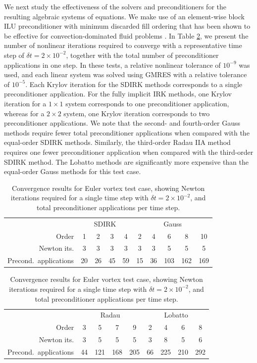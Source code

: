 \documentclass[review]{siamart}
\begin{document}
We next study the effectiveness of the solvers and preconditioners for the
resulting algebraic systems of equations. We make use of an element-wise block
ILU preconditioner with minimum discarded fill ordering that has been shown to
be effective for convection-dominated fluid problems \cite{Persson2008}. In
Table \ref{tab:ev-solvers}, we present the number of nonlinear iterations
required to converge with a representative time step of $\delta t = 2 \times
10^{-2}$, together with the total number of preconditioner applications in one
step. In these tests, a relative nonlinear tolerance of $10^{-9}$ was used, and
each linear system was solved using GMRES with a relative tolerance of
$10^{-5}$. Each Krylov iteration for the SDIRK methods corresponds to a single
preconditioner application. For the fully implicit IRK methods, one Krylov
iteration for a $1\times1$ system corresponds to one preconditioner application,
whereas for a $2\times2$ system, one Krylov iteration corresponds to two
preconditioner applications. We note that the second- and fourth-order Gauss
methods require fewer total preconditioner applications when compared with the
equal-order SDIRK methods. Similarly, the third-order Radau IIA method requires
one fewer preconditioner application when compared with the third-order SDIRK
method. The Lobatto methods are significantly more expensive than the
equal-order Gauss methods for this test case.

\begin{table}
	\centering
	\caption{Convergence results for Euler vortex test case, showing Newton iterations required for a single time step with $\delta t = 2\times10^{-2}$, and total preconditioner applications per time step.
	}
	\label{tab:ev-solvers}
	\begin{tabular}{r|cccc|ccccc}
		\toprule
		& \multicolumn{4}{c|}{SDIRK} & \multicolumn{5}{c}{Gauss} \\
		Order  & 1 & 2 & 3 & 4 & 2 & 4 & 6 & 8 & 10\\
		\midrule
		Newton its. & 3 & 3 & 3 & 3 & 3 & 3 & 5 & 5 & 5\\
		\midrule
		Precond.\ applications & 20 & 26 & 45 & 59 & 15 & 36 & 103 & 162 & 169\\
		\bottomrule
	\end{tabular}

	\vspace{\floatsep}

	\begin{tabular}{r|cccc|cccc}
		\toprule
		& \multicolumn{4}{c|}{Radau} & \multicolumn{4}{c}{Lobatto} \\
		Order  & 3 & 5 & 7 & 9 & 2 & 4 & 6 & 8\\
		\midrule
		Newton its. & 3 & 5 & 5 & 5 & 3 & 8 & 5 & 6\\
		\midrule
		Precond.\ applications & 44 & 121 & 168 & 205 & 66 & 225 & 210 & 292\\
		\bottomrule
	\end{tabular}
\end{table}
\end{document}
